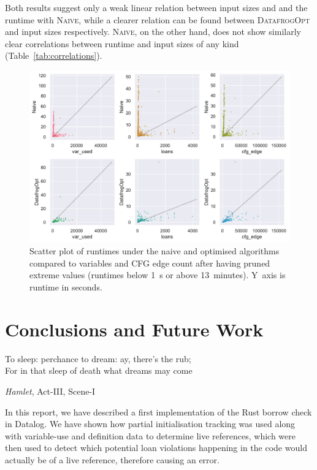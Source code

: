 \documentclass[11pt,a4paper,twoside,openany]{report}
\begin{document}
Both results suggest only a weak linear relation between input sizes and
and the runtime with \textsc{Naive}, while a clearer relation can be
found between \textsc{DatafrogOpt} and input sizes respectively. \textsc{Naive},
on the other hand, does not show similarly clear correlations between runtime
and input sizes of any kind (Table~\ref{tab:correlations}).

\begin{figure}
  \includegraphics[width=0.9\linewidth]{Graphs/corr_scatter.pdf}
  \caption[Scatter Plot of Runtimes On Two Polonius Variants vs.\ nr.\ of CFG
  Edges and Variables]{Scatter plot of runtimes under the naive and optimised
    algorithms compared to variables and CFG edge count after having pruned
    extreme values (runtimes below 1~s or above 13~minutes). Y~axis is runtime
    in seconds.}\label{fig:input-scatter}
\end{figure}

\chapter{Conclusions and Future Work}\label{cha:conclusions}
\epigraph{To sleep: perchance to dream: ay, there's the rub;\\
  For in that sleep of death what dreams may come}%
{\textit{Hamlet}, Act-III, Scene-I}

In this report, we have described a first implementation of the Rust borrow
check in Datalog. We have shown how partial initialisation tracking was used
along with variable-use and definition data to determine live references, which
were then used to detect which potential loan violations happening in the code
would actually be of a live reference, therefore causing an error.
\end{document}
